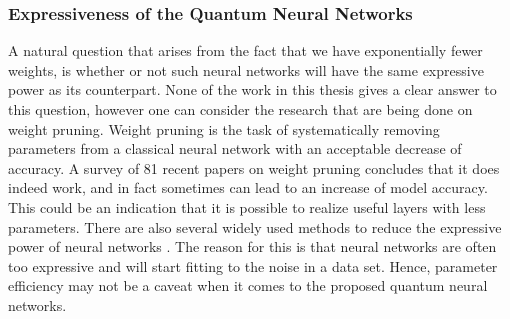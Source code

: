 \subsubsection{Expressiveness of the Quantum Neural Networks}
A natural question that arises from the fact that we have exponentially fewer weights, is whether or not such neural networks will have the same expressive power as its counterpart. None of the work in this thesis gives a clear answer to this question, however one can consider the research that are being done on weight pruning. Weight pruning is the task of systematically removing parameters from a classical neural network with an acceptable decrease of accuracy. A survey of 81 recent papers on weight pruning concludes that it does indeed work, and in fact sometimes can lead to an increase of model accuracy\cite{WeightPruning}. This could be an indication that it is possible to realize useful layers with less parameters.\newline
There are also several widely used methods to reduce the expressive power of neural networks \cite{Dropout}. The reason for this is that neural networks are often too expressive and will start fitting to the noise in a data set. Hence, parameter efficiency may not be a caveat when it comes to the proposed quantum neural networks.









